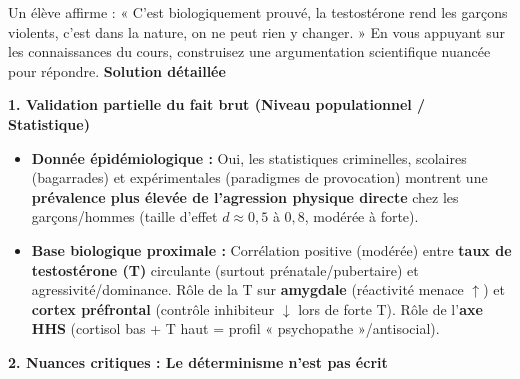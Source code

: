 \documentclass[11pt]{article}
\begin{document}
\begin{exoresolu}
Un élève affirme : « C'est biologiquement prouvé, la testostérone rend les garçons violents, c'est dans la nature, on ne peut rien y changer. » En vous appuyant sur les connaissances du cours, construisez une argumentation scientifique nuancée pour répondre.
\tcblower
\textbf{Solution détaillée}

\textbf{1. Validation partielle du fait brut (Niveau populationnel / Statistique)}
\begin{itemize}
    \item \textbf{Donnée épidémiologique :} Oui, les statistiques criminelles, scolaires (bagarrades) et expérimentales (paradigmes de provocation) montrent une \textbf{prévalence plus élevée de l'agression physique directe} chez les garçons/hommes (taille d'effet $d \approx 0,5$ à $0,8$, modérée à forte).
    \item \textbf{Base biologique proximale :} Corrélation positive (modérée) entre \textbf{taux de testostérone (T)} circulante (surtout prénatale/pubertaire) et agressivité/dominance. Rôle de la T sur \textbf{amygdale} (réactivité menace $\uparrow$) et \textbf{cortex préfrontal} (contrôle inhibiteur $\downarrow$ lors de forte T). Rôle de l'\textbf{axe HHS} (cortisol bas + T haut = profil « psychopathe »/antisocial).
\end{itemize}

\textbf{2. Nuances critiques : Le déterminisme n'est pas écrit}


\end{exoresolu}
\end{document}

